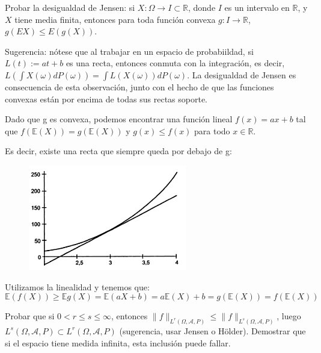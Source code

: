 
\begin{problem}[7] Probar la desigualdad de Jensen: si $X:\Omega\to I\subset \mathbb{R}$, donde
$I$ es un intervalo en $\mathbb{R}$, y $X$ tiene media finita, entonces para toda funci\'on
convexa $g:I\to \mathbb{R}$, $g(EX) \le E(g(X))$. 

Sugerencia: n\'otese que al trabajar en un espacio de probabiildad, si $L(t) := a t + b$ es una recta, entonces conmuta con la integraci\'on,
es decir,
$L(\int X(\omega) dP (\omega)) = \int L (X(\omega)) dP (\omega)$. La desigualdad de Jensen
es consecuencia de esta observaci\'on, junto con el hecho de que las funciones convexas
est\'an por encima de todas sus rectas soporte.
\solution

\begin{expla}

\end{expla}
Dado que g es convexa, podemos encontrar una función lineal $f(x)=ax+b$ tal que $f(\mathbb{E}(X)) = g(\mathbb{E}(X))$ y $g(x)\leq f(x)$ para todo $x \in \mathbb{R}$.

Es decir, existe una recta que siempre queda por debajo de g:
\begin{figure}[h]
\centering
\includegraphics[page=1,scale=0.745]{img/jensen.png}
\end{figure} 

Utilizamos la linealidad y tenemos que:
\[
\mathbb{E}(f(X)) \geq \mathbb{E}g(X) = \mathbb{E}(aX+b)=a\mathbb{E}(X)+b=g(\mathbb{E}(X))=f(\mathbb{E}(X))
\]

\end{problem}


\begin{problem}[8] Probar que si $0 < r\le s \le \infty$,
 entonces $\|f\|_{L^r(\Omega, \mathcal{A}, P)}\le \|f\|_{L^s(\Omega, \mathcal{A}, P)}$, luego $L^s(\Omega, \mathcal{A}, P) \subset L^r(\Omega, \mathcal{A}, P)$ (sugerencia, usar Jensen o H\"older). Demostrar que si el espacio tiene medida infinita, esta
inclusi\'on puede fallar.
\solution

\begin{expla}

\end{expla}

\end{problem}


